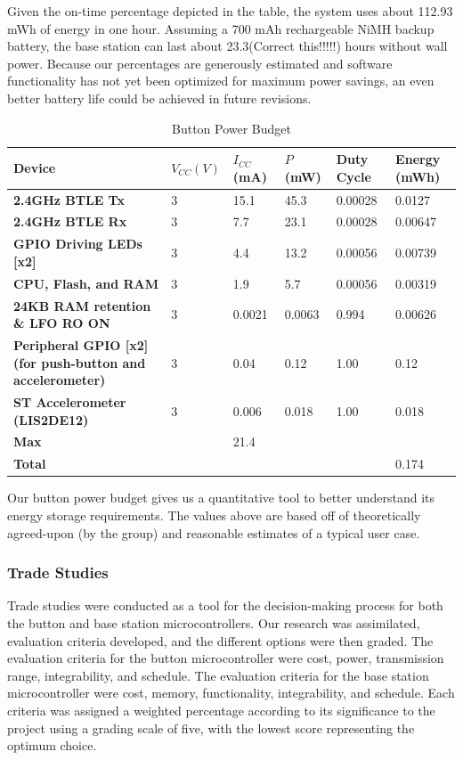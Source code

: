 \documentclass[journal,compsoc]{IEEEtran}
\begin{document}
Given the on-time percentage depicted in the table, the system uses about 112.93 mWh of energy in one hour. Assuming a 700 mAh rechargeable NiMH backup battery, the base station can last about 23.3(Correct this!!!!!) hours without wall power. Because our percentages are generously estimated and software functionality has not yet been optimized for maximum power savings, an even better battery life could be achieved in future revisions.

\begin{table}[t]
  \centering
  \begin{tabular}{>{\bfseries}l|l l l l l}
    Device & $V_{CC} (V)$ & $I_{CC}$ (mA) & $P$ (mW) & Duty Cycle & Energy (mWh) \\
    \hline
    2.4GHz BTLE Tx & 3 & 15.1 & 45.3 & 0.00028 & 0.0127 \\
    2.4GHz BTLE Rx & 3 & 7.7 & 23.1 & 0.00028 & 0.00647 \\
    GPIO Driving LEDs [x2] & 3 & 4.4 & 13.2 & 0.00056 & 0.00739 \\
    CPU, Flash, and RAM & 3 & 1.9 & 5.7 & 0.00056 & 0.00319 \\
    24KB RAM retention \& LFO RO ON & 3 & 0.0021 & 0.0063 & 0.994 & 0.00626 \\
    Peripheral GPIO [x2] (for push-button and accelerometer) & 3 & 0.04 & 0.12 & 1.00 & 0.12 \\
    ST Accelerometer (LIS2DE12) & 3 & 0.006 & 0.018 & 1.00 & 0.018 \\
    \hline
    Max & & 21.4 & & & \\
    Total & & & & & 0.174
  \end{tabular}
  \caption{Button Power Budget}
\end{table}

Our button power budget gives us a quantitative tool to better understand its energy storage requirements.  The values above are based off of theoretically agreed-upon (by the group) and reasonable estimates of a typical user case.

\subsubsection{Trade Studies}
Trade studies were conducted as a tool for the decision-making process for both the button and base station microcontrollers.  Our research was assimilated, evaluation criteria developed, and the different options were then graded. The evaluation criteria for the button microcontroller were cost, power, transmission range, integrability, and schedule.  The evaluation criteria for the base station microcontroller were cost, memory, functionality, integrability, and schedule.  Each criteria was assigned a weighted percentage according to its significance to the project using a grading scale of five, with the lowest score representing the optimum choice.
\end{document}
